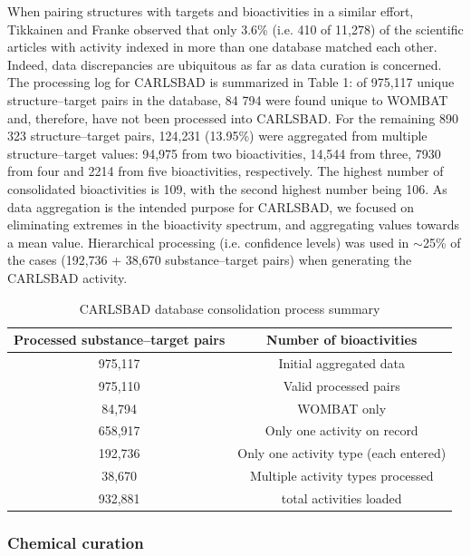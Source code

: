 When pairing structures with targets and bioactivities in a similar effort, Tikkainen and Franke observed that only 3.6\% (i.e. 410 of 11,278) of the scientific articles with activity indexed in more than one database matched each other. Indeed, data discrepancies are ubiquitous as far as data curation is concerned\cite{Tiikkainen2012-cw}. The processing log for CARLSBAD is summarized in Table 1: of 975,117 unique structure–target pairs in the database, 84 794 were found unique to WOMBAT and, therefore, have not been processed into CARLSBAD. For the remaining 890 323 structure–target pairs, 124,231 (13.95\%) were aggregated from multiple structure–target values: 94,975 from two bioactivities, 14,544 from three, 7930 from four and 2214 from five bioactivities, respectively. The highest number of consolidated bioactivities is 109, with the second highest number being 106. As data aggregation is the intended purpose for CARLSBAD, we focused on eliminating extremes in the bioactivity spectrum, and aggregating values towards a mean value. Hierarchical processing (i.e. confidence levels) was used in $\sim$25\% of the cases (192,736 + 38,670 substance–target pairs) when generating the CARLSBAD activity.

\begin{table}[]
\centering
\begin{tabular}{c|c}
\hline
\textbf{Processed substance–target pairs} & \textbf{Number of bioactivities} \\
\hline
975,117 & Initial aggregated data   \\
975,110 & Valid processed pairs   \\
84,794 & WOMBAT only   \\
658,917 & Only one activity on record  \\ 
192,736 & Only one activity type (each entered)  \\ 
38,670 & Multiple activity types processed   \\
932,881 & total activities loaded   \\
\hline
\end{tabular}
\caption{CARLSBAD database consolidation process summary}
\label{tab:cb_01}
\end{table}

\subsubsection{Chemical curation}

